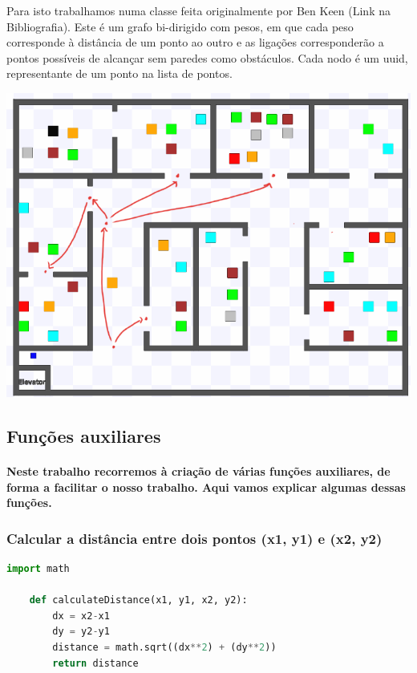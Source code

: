 \documentclass{article}
\begin{document}
Para isto trabalhamos numa classe feita originalmente por Ben Keen (Link na Bibliografia). Este é um grafo bi-dirigido com pesos, em que cada peso corresponde à distância de um ponto ao outro e as ligações corresponderão a pontos possíveis de alcançar sem paredes como obstáculos. Cada nodo é um uuid, representante de um ponto na lista de pontos.

\includegraphics[scale=0.4]{rosexample.png}

\newpage
\subsection{Funções auxiliares}  
  
\paragraph{Neste trabalho recorremos à criação de várias funções auxiliares, de forma a facilitar o nosso trabalho. Aqui vamos explicar algumas dessas funções.}

\subsubsection{Calcular a distância entre dois pontos (x1, y1) e (x2, y2)}
\begin{lstlisting}[language=Python]
    import math

    def calculateDistance(x1, y1, x2, y2):
        dx = x2-x1
        dy = y2-y1
        distance = math.sqrt((dx**2) + (dy**2))
        return distance
\end{lstlisting}
\end{document}
